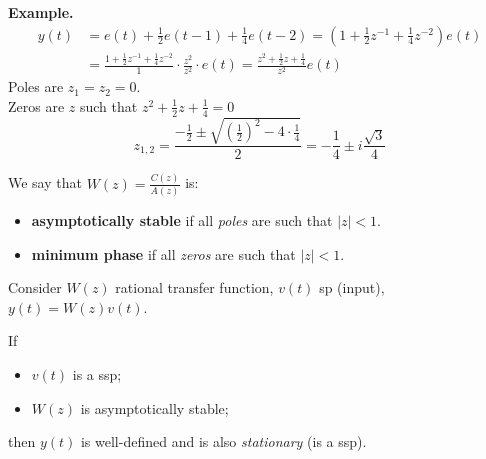 \textbf{Example.}
\begin{align*}
y(t) &=e(t)+\frac{1}{2} e(t-1)+\frac{1}{4} e(t-2) =\left(1+\frac{1}{2} z^{-1}+\frac{1}{4} z^{-2}\right) e(t) \\
&=\frac{1+\frac{1}{2} z^{-1}+\frac{1}{4} z^{-2}}{1} \cdot \frac{z^{2}}{z^{2}}\cdot e(t) =\frac{z^{2}+\frac{1}{2} z+\frac{1}{4}}{z^{2}} e(t)
\end{align*}
Poles are $z_{1}=z_{2}=0$.\\
Zeros are $z$ such that $z^{2}+\frac{1}{2} z+\frac{1}{4}=0$
\[
	z_{1,2}=\frac{-\frac{1}{2} \pm \sqrt{\left( \frac{1}{2}  \right) ^2 -4\cdot\frac{1}{4} } }{2} = -\frac{1}{4}\pm i\frac{\sqrt{3} }{4}
\]
\begin{figure}[htpb]
	\centering
\end{figure}
\FloatBarrier

\begin{definition}
	We say that $W(z)=\frac{C(z)}{A(z)}$ is:
	\begin{itemize}
		\item \textbf{asymptotically stable} if all \emph{poles} are such that $|z|<1$.
		\item \textbf{minimum phase} if all \emph{zeros} are such that $|z|<1$.
	\end{itemize}
\end{definition}

Consider $W(z)$ rational transfer function, $v(t)$ \gls{sp} (input), $y(t)=W(z)v(t)$.

\begin{theorem}
	If
	\begin{itemize}
		\item $v(t)$ is a \gls{ssp};
		\item $W(z)$ is asymptotically stable;
	\end{itemize}
	then $y(t)$ is well-defined and is also \emph{stationary} (is a \gls{ssp}).
\end{theorem}

